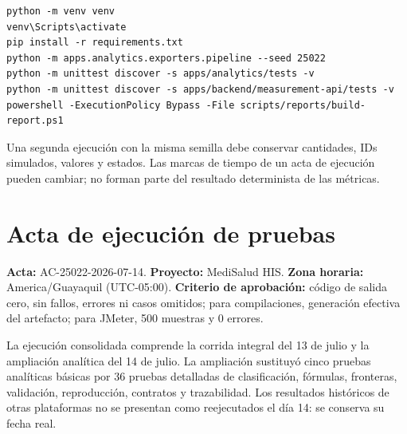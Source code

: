 \begin{verbatim}
python -m venv venv
venv\Scripts\activate
pip install -r requirements.txt
python -m apps.analytics.exporters.pipeline --seed 25022
python -m unittest discover -s apps/analytics/tests -v
python -m unittest discover -s apps/backend/measurement-api/tests -v
powershell -ExecutionPolicy Bypass -File scripts/reports/build-report.ps1
\end{verbatim}

Una segunda ejecución con la misma semilla debe conservar cantidades, IDs simulados, valores y estados. Las marcas de tiempo de un acta de ejecución pueden cambiar; no forman parte del resultado determinista de las métricas.

\section{Acta de ejecución de pruebas}

\textbf{Acta:} AC-25022-2026-07-14. \textbf{Proyecto:} MediSalud HIS. \textbf{Zona horaria:} America/Guayaquil (UTC-05:00). \textbf{Criterio de aprobación:} código de salida cero, sin fallos, errores ni casos omitidos; para compilaciones, generación efectiva del artefacto; para JMeter, 500 muestras y 0 errores.

La ejecución consolidada comprende la corrida integral del 13 de julio y la ampliación analítica del 14 de julio. La ampliación sustituyó cinco pruebas analíticas básicas por 36 pruebas detalladas de clasificación, fórmulas, fronteras, validación, reproducción, contratos y trazabilidad. Los resultados históricos de otras plataformas no se presentan como reejecutados el día 14: se conserva su fecha real.

